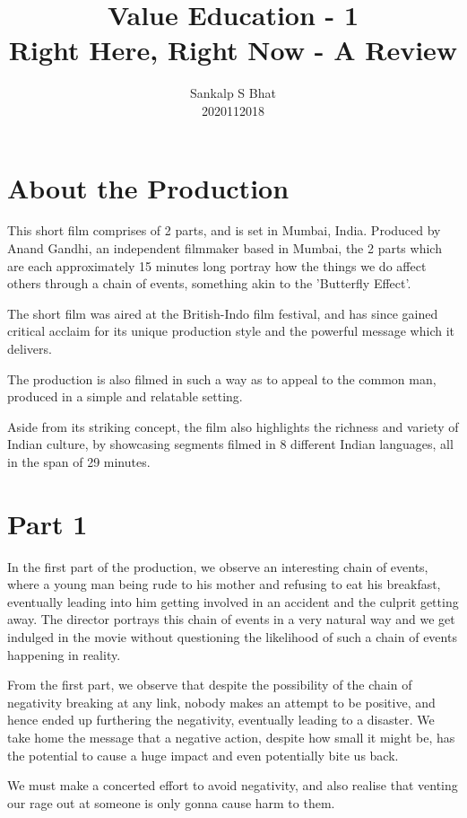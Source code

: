 \documentclass[a4paper, 12pt]{extarticle}
\title{Value Education - 1\\
Right Here, Right Now - A Review}
\author{Sankalp S Bhat\\
2020112018
}
\begin{document}
\maketitle
\thispagestyle{empty}

\section*{About the Production}
This short film comprises of 2 parts, and is set in Mumbai, India. Produced by Anand Gandhi, an independent filmmaker based in Mumbai, the 2 parts which are each approximately 15 minutes long portray how the things we do affect others through a chain of events, something akin to the 'Butterfly Effect'.

The short film was aired at the British-Indo film festival, and has since gained critical acclaim for its unique production style and the powerful message which it delivers.

The production is also filmed in such a way as to appeal to the common man, produced in a simple and relatable setting.

Aside from its striking concept, the film also highlights the richness and variety of Indian culture, by showcasing segments filmed in 8 different Indian languages, all in the span of 29 minutes.

\section*{Part 1}

In the first part of the production, we observe an interesting chain of events, where a young man being rude to his mother and refusing to eat his breakfast, eventually leading into him getting involved in an accident and the culprit getting away. The director portrays this chain of events in a very natural way and we get indulged in the movie without questioning the likelihood of such a chain of events happening in reality.

From the first part, we observe that despite the possibility of the chain of negativity breaking at any link, nobody makes an attempt to be positive, and hence ended up furthering the negativity, eventually leading to a disaster. We take home the message that a negative action, despite how small it might be, has the potential to cause a huge impact and even potentially bite us back.

We must make a concerted effort to avoid negativity, and also realise that venting our rage out at someone is only gonna cause harm to them.
     
\end{document}
